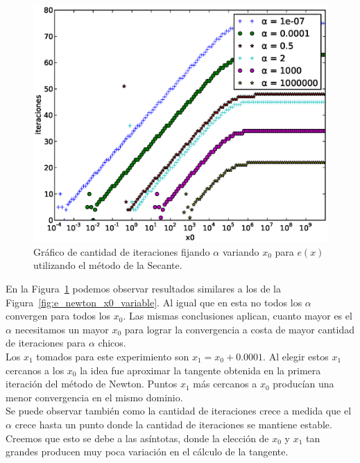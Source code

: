 \begin{figure}[!htbp]
  \begin{center}
    \includegraphics[scale=0.5]{graficos/new/e_secante_x0_variable.eps}
    \caption{\label{fig:e_secante_x0_variable} Gráfico de cantidad de iteraciones fijando $\alpha$ variando $x_0$ para $e(x)$ utilizando el método de la Secante.}
  \end{center}
\end{figure}

En la Figura~\ref{fig:e_secante_x0_variable} podemos observar resultados
similares a los de la Figura~\ref{fig:e_newton_x0_variable}. Al igual que en
esta no todos los $\alpha$ convergen para todos los $x_0$. Las mismas
conclusiones aplican, cuanto mayor es el $\alpha$ necesitamos un mayor $x_0$
para lograr la convergencia a costa de mayor cantidad de iteraciones para
$\alpha$ chicos.\\

Los $x_1$ tomados para este experimiento son $x_1 = x_0 + 0.0001$. Al elegir
estos $x_1$ cercanos a los $x_0$ la idea fue aproximar la tangente obtenida en
la primera iteración del método de Newton. Puntos $x_1$ más cercanos a $x_0$
producían una menor convergencia en el mismo dominio.\\

Se puede observar también como la cantidad de iteraciones crece a medida que el
$\alpha$ crece hasta un punto donde la cantidad de iteraciones se mantiene
estable. Creemos que esto se debe a las asíntotas, donde la elección de $x_0$ y
$x_1$ tan grandes producen muy poca variación en el cálculo de la tangente.\\

